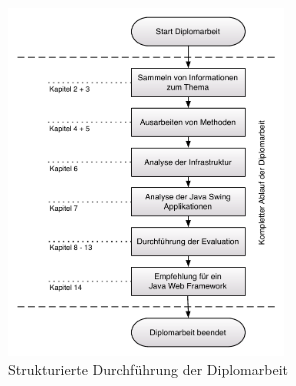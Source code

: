   \begin{figure}[htbp]
    \begin{center}
      \includegraphics[width=0.65\textwidth]{./image/durchfuehrungDerDiplomarbeit.pdf}
      \caption{Strukturierte Durchführung der Diplomarbeit}
      \label{img:durchfuehrungDerDiplomarbeit}
    \end{center}
  \end{figure}
    